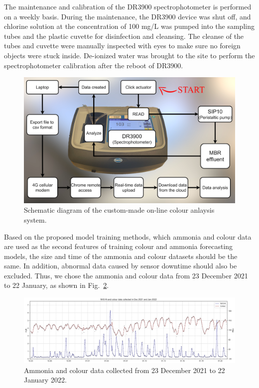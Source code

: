 The maintenance and calibration of the DR3900 spectrophotometer is performed on a weekly basis. During the maintenance, the DR3900 device was shut off, and chlorine solution at the concentration of 100 mg/L was pumped into the sampling tubes and the plastic cuvette for disinfection and cleansing. The cleanse of the tubes and cuvette were manually inspected with eyes to make sure no foreign objects were stuck inside. De-ionized water was brought to the site to perform the spectrophotometer calibration after the reboot of DR3900. 

\begin{figure}[h]
    \centering
    \includegraphics[width=0.8\columnwidth]{imgs/instrument/colour-sampler.png}
    \caption{Schematic diagram of the custom-made on-line colour anlaysis system.}
    \label{fig:diagram-colour-analysis}
 \end{figure}

Based on the proposed model training methods, which ammonia and colour data are used as the second features of training colour and ammonia forecasting models, the size and time of the ammonia and colour datasets should be the same. In addition, abnormal data caused by sensor downtime should also be excluded. Thus, we chose the ammonia and colour data from 23 December 2021 to 22 January, as shown in Fig.~\ref{fig:nh3-color-data}.

\begin{figure}[h]
    \centering
    \includegraphics[width=1.0\columnwidth]{imgs/results/data.png}
    \caption{Ammonia and colour data collected from 23 December 2021 to 22 January 2022.}
    \label{fig:nh3-color-data}
\end{figure}

